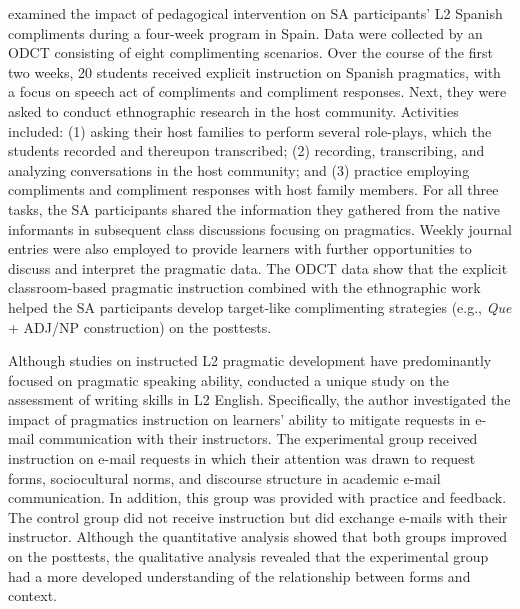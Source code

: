 \documentclass[output=paper]{langscibook}
\begin{document}
\citet{Mir2020} examined the impact of pedagogical intervention on SA participants’ L2 Spanish compliments during a four-week program in Spain. Data were collected by an ODCT consisting of eight complimenting scenarios. Over the course of the first two weeks, 20 students received explicit instruction on Spanish pragmatics, with a focus on speech act of compliments and compliment responses. Next, they were asked to conduct ethnographic research in the host community. Activities included: (1) asking their host families to perform several role-plays, which the students recorded and thereupon transcribed; (2) recording, transcribing, and analyzing conversations in the host community; and (3) practice employing compliments and compliment responses with host family members. For all three tasks, the SA participants shared the information they gathered from the native informants in subsequent class discussions focusing on pragmatics. Weekly journal entries were also employed to provide learners with further opportunities to discuss and interpret the pragmatic data. The ODCT data show that the explicit classroom-based pragmatic instruction combined with the ethnographic work helped the SA participants develop target-like complimenting strategies (e.g., \textit{Que} + ADJ/NP construction) on the posttests.

\begin{sloppypar}
  Although studies on instructed L2 pragmatic development have predominantly focused on pragmatic speaking ability, \citet{Alcón-Soler2015} conducted a unique study on the assessment of writing skills in L2 English. Specifically, the author investigated the impact of pragmatics instruction on learners’ ability to mitigate requests in e-mail communication with their instructors. The experimental group received instruction on e-mail requests in which their attention was drawn to request forms, sociocultural norms, and discourse structure in academic e-mail communication. In addition, this group was provided with practice and feedback. The control group did not receive instruction but did exchange e-mails with their instructor. Although the quantitative analysis showed that both groups improved on the posttests, the qualitative analysis revealed that the experimental group had a more developed understanding of the relationship between forms and context.
\end{sloppypar}
\end{document}
